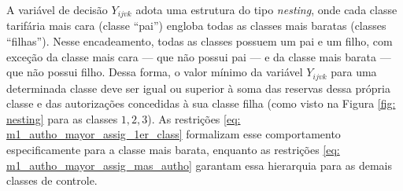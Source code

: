 A variável de decisão $Y_{ijvk}$ adota uma estrutura do tipo \textit{nesting}, onde cada classe tarifária mais cara (classe “pai”) engloba todas as classes mais baratas (classes “filhas”). Nesse encadeamento, todas as classes possuem um pai e um filho, com exceção da classe mais cara — que não possui pai — e da classe mais barata — que não possui filho. Dessa forma, o valor mínimo da variável $Y_{ijvk}$ para uma determinada classe deve ser igual ou superior à soma das reservas dessa própria classe e das autorizações concedidas à sua classe filha (como visto na Figura \ref{fig: nesting} para as classes $1, 2, 3$). As restrições \eqref{eq: m1_autho_mayor_assig_1er_class} formalizam esse comportamento especificamente para a classe mais barata, enquanto as restrições \eqref{eq: m1_autho_mayor_assig_mas_autho} garantam essa hierarquia para as demais classes de controle.
